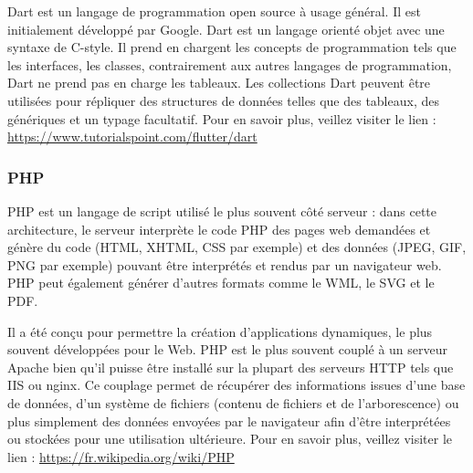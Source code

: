 Dart est un langage de programmation open source à usage général. Il est initialement développé par Google. Dart est un langage orienté objet avec une syntaxe de C-style. Il prend en chargent les concepts de programmation tels que les interfaces, les classes, contrairement aux autres langages de programmation, Dart ne prend pas en charge les tableaux.
Les collections Dart peuvent être utilisées pour répliquer des structures de données telles que des tableaux, des génériques et un typage facultatif.
\newline Pour en savoir plus, veillez
visiter le lien : \href{https://www.tutorialspoint.com/flutter/flutter_introduction_to_dart_programming.htm}{https://www.tutorialspoint.com/flutter/dart}
\subsubsection{PHP}

PHP est un langage de script utilisé le plus souvent côté serveur : dans cette architecture, le serveur interprète le code PHP des pages web demandées et génère du code (HTML, XHTML, CSS par exemple) et des données (JPEG, GIF, PNG par exemple) pouvant être interprétés et rendus par un navigateur web. PHP peut également générer d'autres formats comme le WML, le SVG et le PDF.

Il a été conçu pour permettre la création d'applications dynamiques, le plus souvent développées pour le Web. PHP est le plus souvent couplé à un serveur Apache bien qu'il puisse être installé sur la plupart des serveurs HTTP tels que IIS ou nginx. Ce couplage permet de récupérer des informations issues d'une base de données, d'un système de fichiers (contenu de fichiers et de l'arborescence) ou plus simplement des données envoyées par le navigateur afin d'être interprétées ou stockées pour une utilisation ultérieure.
\newline Pour en savoir plus, veillez
visiter le lien : \href{https://fr.wikipedia.org/wiki/PHP}{https://fr.wikipedia.org/wiki/PHP}
